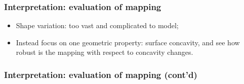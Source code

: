 \documentclass{beamer}
\begin{document}
\begin{frame}
\frametitle{Interpretation: evaluation of mapping}

\begin{itemize}
\item Shape variation: too vast and complicated to model;
\item Instead focus on one geometric property: surface concavity, and see how robust is the mapping with respect to concavity changes.
\end{itemize}


\end{frame}

\begin{frame}
\frametitle{Interpretation: evaluation of mapping (cont'd)}


\end{frame}
\end{document}
